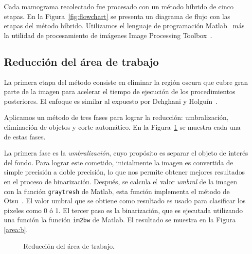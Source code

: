 Cada mamograma recolectado fue procesado con un método híbrido de cinco etapas.
En la Figura~\ref{fig:flowchart} se presenta un diagrama de flujo con las
etapas del método híbrido. Utilizamos el lenguaje de programación
Matlab~\cite{matlab} más la utilidad de procesamiento de imágenes Image
Processing Toolbox~\cite{ipt}.

\shorthandoff{>} %
    
\shorthandon{>} 

\subsection{Reducción del área de trabajo}

La primera etapa del método consiste en eliminar la región oscura que cubre
gran parte de la imagen para acelerar el tiempo de ejecución de los
procedimientos posteriores. El enfoque es similar al expuesto por Dehghani y
Holguín~\cite{dehghani2011method, holguinpre}.

Aplicamos un método de tres fases para lograr la reducción: umbralización,
eliminación de objetos y corte automático. En la Figura~\ref{reduction} se
muestra cada una de estas fases. 

La primera fase es la \textit{umbralización}, cuyo propósito es separar el
objeto de interés del fondo. Para lograr este cometido, inicialmente la imagen
es convertida de simple precisión a doble precisión, lo que nos permite obtener
mejores resultados en el proceso de binarización. Después, se calcula el valor
\textit{umbral} de la imagen con la función \texttt{graytresh} de Matlab, esta
función implementa el método de Otsu~\cite{otsumethod}. El valor umbral que se
obtiene como resultado es usado para clasificar los pixeles como 0 ó 1. El
tercer paso es la binarización, que es ejecutada utilizando una función la
función \texttt{im2bw} de Matlab. El resultado se muestra en la Figura
\ref{area:b}.

\begin{figure}[h]
    \centering


    \bigskip
    

  \caption[Reducción del área de trabajo]
  {Reducción del área de trabajo.}
  \label{reduction}
\end{figure}


